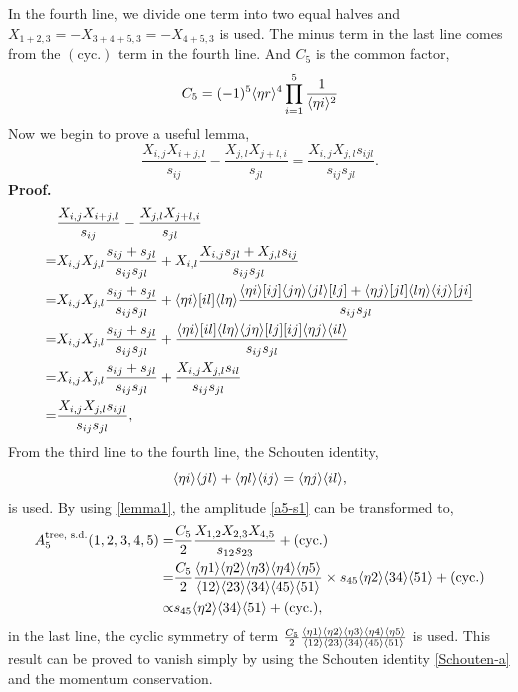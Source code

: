 \documentclass[a4paper,11pt]{article}
\begin{document}
In the fourth line, we divide one term into two equal halves and $X_{1+2,3}=-X_{3+4+5,3}=-X_{4+5,3}$ is used. The minus term in the last line comes from the $(\text{cyc.})$ term in the fourth line.
And $C_5$ is the common factor,
\begin{equation*}
    C_5=(-1)^5\langle \eta r \rangle^4\prod_{i=1}^5\frac{1}{\langle \eta i \rangle^2}
\end{equation*} Now we begin to prove a useful lemma,
\begin{equation}\label{lemma1}
    \frac{X_{i,j}X_{i+j,l}}{s_{ij}}-\frac{X_{j,l}X_{j+l,i}}{s_{jl}}=\frac{X_{i,j}X_{j,l}s_{ijl}}{s_{ij}s_{jl}}.
\end{equation}
\textbf{Proof.}
\begin{equation*}
    \begin{split}
        &\frac{X_{i,j}X_{i+j,l}}{s_{ij}}-\frac{X_{j,l}X_{j+l,i}}{s_{jl}}\\
        =&X_{i,j}X_{j,l}\frac{s_{ij}+s_{jl}}{s_{ij}s_{jl}}+X_{i,l}\frac{X_{i,j}s_{jl}+X_{j,l}s_{ij}}{s_{ij}s_{jl}}\\
        =&X_{i,j}X_{j,l}\frac{s_{ij}+s_{jl}}{s_{ij}s_{jl}}
        +\langle \eta i \rangle[i l]\langle l \eta \rangle\frac{\langle \eta i \rangle[i j]\langle j \eta \rangle\langle jl \rangle[lj]+\langle \eta j \rangle[j l]\langle l \eta \rangle\langle ij \rangle[ji]}{s_{ij}s_{jl}}\\
        =&X_{i,j}X_{j,l}\frac{s_{ij}+s_{jl}}{s_{ij}s_{jl}}
        +\frac{\langle \eta i \rangle[i l]\langle l \eta \rangle\langle j \eta \rangle[lj][ij]\langle \eta j  \rangle\langle il \rangle}{s_{ij}s_{jl}}\\
        =&X_{i,j}X_{j,l}\frac{s_{ij}+s_{jl}}{s_{ij}s_{jl}}
        +\frac{X_{i,j}X_{j,l}s_{il}}{s_{ij}s_{jl}}\\
        =&\frac{X_{i,j}X_{j,l}s_{ijl}}{s_{ij}s_{jl}},
    \end{split}
\end{equation*}
From the third line to the fourth line, the Schouten identity,
\begin{equation*}
    \langle \eta i \rangle\langle jl \rangle+\langle \eta l \rangle\langle ij \rangle=\langle \eta j \rangle\langle il \rangle,
\end{equation*}
is used. By using \eqref{lemma1}, the amplitude \eqref{a5-s1} can be transformed to,
\begin{equation}
    \begin{split}
    A_5^{\text{tree, s.d.}}(1,2,3,4,5)=&\frac{C_5}{2}\frac{X_{1,2}X_{2,3}X_{4,5}}{s_{12}s_{23}}+(\text{cyc.})\\
    =&\frac{C_5}{2}\frac{\langle \eta 1 \rangle\langle \eta 2 \rangle\langle \eta 3 \rangle\langle \eta 4 \rangle\langle \eta 5 \rangle}{\langle 12 \rangle\langle 23 \rangle\langle 34 \rangle\langle 45 \rangle\langle 51 \rangle}
        \times{s_{45}\langle \eta 2 \rangle\langle 34 \rangle\langle 51 \rangle}+(\text{cyc.})\\
        \propto& {s_{45}\langle \eta 2 \rangle\langle 34 \rangle\langle 51 \rangle}+(\text{cyc.}),
    \end{split}
\end{equation}
in the last line, the cyclic symmetry of term $\frac{C_5}{2}\frac{\langle \eta 1 \rangle\langle \eta 2 \rangle\langle \eta 3 \rangle\langle \eta 4 \rangle\langle \eta 5 \rangle}{\langle 12 \rangle\langle 23 \rangle\langle 34 \rangle\langle 45 \rangle\langle 51 \rangle}$ is used.
This result can be proved to vanish simply by using the Schouten identity \eqref{Schouten-a} and the momentum conservation.


\end{document}
